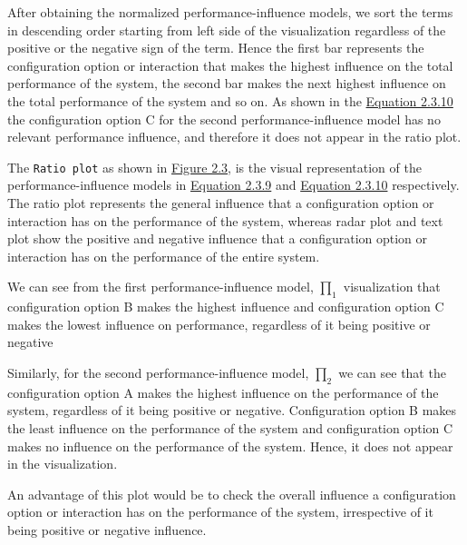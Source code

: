 \begin{description}[leftmargin=0pt]
\item[Visualization: ] 
After obtaining the normalized performance-influence models, we sort the terms in descending order starting from left side of the visualization regardless of the positive or the negative sign of the term. Hence the first bar represents the configuration option or interaction that makes the highest influence on the total performance of the system, the second bar makes the next highest influence on the total performance of the system and so on. As shown in the \hyperref[eq:2.3.10]{Equation 2.3.10} the configuration option C for the second performance-influence model has no relevant performance influence, and therefore it does not appear in the ratio plot.

The \texttt{Ratio plot} as shown in \hyperref[ratioPlot]{Figure 2.3}, is the visual representation of the performance-influence models in \hyperref[eq:2.3.9]{Equation 2.3.9} and \hyperref[eq:2.3.10]{Equation 2.3.10} respectively. The ratio plot represents the general influence that a configuration option or interaction has on the performance of the system, whereas radar plot and text plot show the positive and negative influence that a configuration option or interaction has on the performance of the entire system. 

We can see from the first performance-influence model, $\prod_1$ visualization that configuration option B makes the highest influence and configuration option C makes the lowest influence on performance, regardless of it being positive or negative 

Similarly, for the second performance-influence model, $\prod_2$ we can see that the configuration option A makes the highest influence on the performance of the system, regardless of it being positive or negative. Configuration option B makes the least influence on the performance of the system and configuration option C makes no influence on the performance of the system. Hence, it does not appear in the visualization.

An advantage of this plot would be to check the overall influence a configuration option or interaction has on the performance of the system, irrespective of it being positive or negative influence.

\end{description}